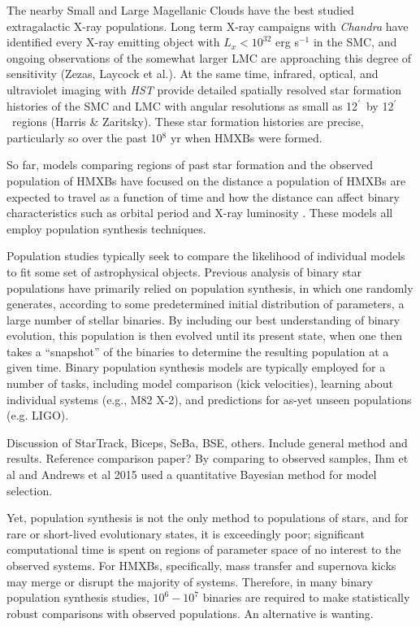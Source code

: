 \documentclass[12pt, preprint]{aastex}
\newcommand{\amin}{\ifmmode {^{\prime}\ }\else$^{\prime}$\fi}
\begin{document}
The nearby Small and Large Magellanic Clouds have the best studied extragalactic X-ray populations. Long term X-ray campaigns with {\it Chandra} have identified every X-ray emitting object with $L_x < 10^{32}$ erg s$^{-1}$ in the SMC, and ongoing observations of the somewhat larger LMC are approaching this degree of sensitivity (Zezas, Laycock et al.). At the same time, infrared, optical, and ultraviolet imaging with {\it HST} provide detailed spatially resolved star formation histories of the SMC and LMC with angular resolutions as small as 12\amin\ by 12\amin\ regions (Harris \& Zaritsky). These star formation histories are precise, particularly so over the past 10$^8$ yr when HMXBs were formed.


So far, models comparing regions of past star formation and the observed population of HMXBs have focused on the distance a population of HMXBs are expected to travel as a function of time \citep{sepinsky05} and how the distance can affect binary characteristics such as orbital period and X-ray luminosity \citep{zuo10, zuo15}. These models all employ population synthesis techniques.


Population studies typically seek to compare the likelihood of individual models to fit some set of astrophysical objects. Previous analysis of binary star populations have primarily relied on population synthesis, in which one randomly generates, according to some predetermined initial distribution of parameters, a large number of stellar binaries. By including our best understanding of binary evolution, this population is then evolved until its present state, when one then takes a ``snapshot'' of the binaries to determine the resulting population at a given time. Binary population synthesis models are typically employed for a number of tasks, including model comparison (kick velocities), learning about individual systems (e.g., M82 X-2), and predictions for as-yet unseen populations (e.g. LIGO). 


Discussion of StarTrack, Biceps, SeBa, BSE, others. Include general method and results. Reference comparison paper? By comparing to observed samples, Ihm et al and Andrews et al 2015 used a quantitative Bayesian method for model selection.


Yet, population synthesis is not the only method to populations of stars, and for rare or short-lived evolutionary states, it is exceedingly poor; significant computational time is spent on regions of parameter space of no interest to the observed systems. For HMXBs, specifically, mass transfer and supernova kicks may merge or disrupt the majority of systems. Therefore, in many binary population synthesis studies, $10^6-10^7$ binaries are required to make statistically robust comparisons with observed populations. An alternative is wanting.
\end{document}

